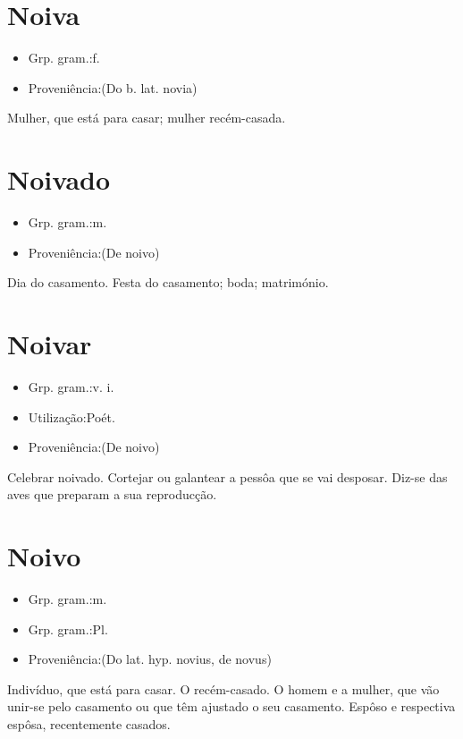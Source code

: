 \section{Noiva}
\begin{itemize}
\item {Grp. gram.:f.}
\end{itemize}
\begin{itemize}
\item {Proveniência:(Do b. lat. \textunderscore novia\textunderscore )}
\end{itemize}
Mulher, que está para casar; mulher recém-casada.
\section{Noivado}
\begin{itemize}
\item {Grp. gram.:m.}
\end{itemize}
\begin{itemize}
\item {Proveniência:(De \textunderscore noivo\textunderscore )}
\end{itemize}
Dia do casamento.
Festa do casamento; boda; matrimónio.
\section{Noivar}
\begin{itemize}
\item {Grp. gram.:v. i.}
\end{itemize}
\begin{itemize}
\item {Utilização:Poét.}
\end{itemize}
\begin{itemize}
\item {Proveniência:(De \textunderscore noivo\textunderscore )}
\end{itemize}
Celebrar noivado.
Cortejar ou galantear a pessôa que se vai desposar.
Diz-se das aves que preparam a sua reproducção.
\section{Noivo}
\begin{itemize}
\item {Grp. gram.:m.}
\end{itemize}
\begin{itemize}
\item {Grp. gram.:Pl.}
\end{itemize}
\begin{itemize}
\item {Proveniência:(Do lat. hyp. \textunderscore novius\textunderscore , de \textunderscore novus\textunderscore )}
\end{itemize}
Indivíduo, que está para casar.
O recém-casado.
O homem e a mulher, que vão unir-se pelo casamento ou que têm ajustado o seu casamento.
Espôso e respectiva espôsa, recentemente casados.
